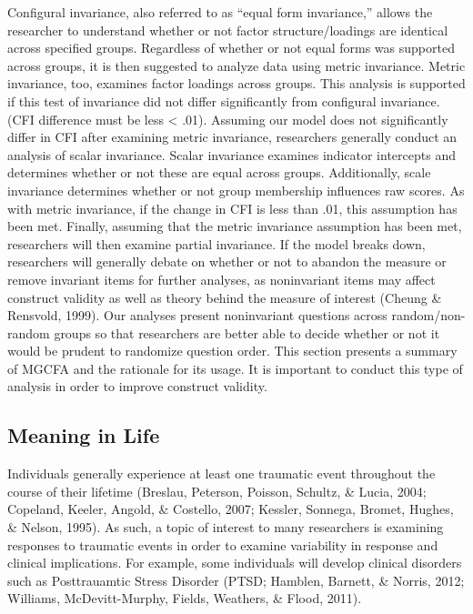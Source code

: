 \documentclass[man,draftall]{apa6}
\begin{document}
Configural invariance, also referred to as \enquote{equal form invariance,} allows the researcher to understand whether or not factor structure/loadings are identical across specified groups. Regardless of whether or not equal forms was supported across groups, it is then suggested to analyze data using metric invariance. Metric invariance, too, examines factor loadings across groups. This analysis is supported if this test of invariance did not differ significantly from configural invariance. (CFI difference must be less \textless{} .01). Assuming our model does not significantly differ in CFI after examining metric invariance, researchers generally conduct an analysis of scalar invariance. Scalar invariance examines indicator intercepts and determines whether or not these are equal across groups. Additionally, scale invariance determines whether or not group membership influences raw scores. As with metric invariance, if the change in CFI is less than .01, this assumption has been met. Finally, assuming that the metric invariance assumption has been met, researchers will then examine partial invariance. If the model breaks down, researchers will generally debate on whether or not to abandon the measure or remove invariant items for further analyses, as noninvariant items may affect construct validity as well as theory behind the measure of interest (Cheung \& Rensvold, 1999). Our analyses present noninvariant questions across random/non-random groups so that researchers are better able to decide whether or not it would be prudent to randomize question order. This section presents a summary of MGCFA and the rationale for its usage. It is important to conduct this type of analysis in order to improve construct validity.

\hypertarget{meaning-in-life}{%
\subsection{Meaning in Life}\label{meaning-in-life}}

Individuals generally experience at least one traumatic event throughout the course of their lifetime (Breslau, Peterson, Poisson, Schultz, \& Lucia, 2004; Copeland, Keeler, Angold, \& Costello, 2007; Kessler, Sonnega, Bromet, Hughes, \& Nelson, 1995). As such, a topic of interest to many researchers is examining responses to traumatic events in order to examine variability in response and clinical implications. For example, some individuals will develop clinical disorders such as Posttrauamtic Stress Disorder (PTSD; Hamblen, Barnett, \& Norris, 2012; Williams, McDevitt-Murphy, Fields, Weathers, \& Flood, 2011).
\end{document}
